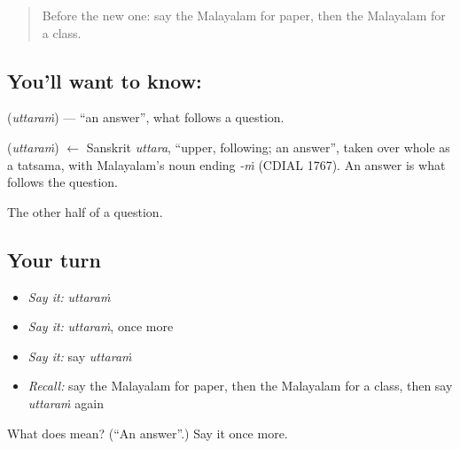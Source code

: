 \label{lesson:ML-C140-answer}



\begin{quote}
Before the new one: say the Malayalam for paper, then the Malayalam for a class.
\end{quote}

\subsection*{You'll want to know: }
\textbf{} (\emph{uttaraṁ}) — \textquotedblleft{}an answer\textquotedblright{}, what follows a question.

\begin{cousinweb}
\textbf{} (\emph{uttaraṁ}) $\leftarrow$ Sanskrit \emph{uttara}, \textquotedblleft{}upper, following; an answer\textquotedblright{}, taken over whole as a tatsama, with Malayalam's noun ending \emph{-ṁ} (CDIAL 1767). An answer is what follows the question.
\end{cousinweb}

\begin{grammarlens}[title={What you've built}]
The other half of a question.
\end{grammarlens}

\subsection*{Your turn}
\begin{itemize}
\raggedright
  \item \emph{Say it:} \emph{uttaraṁ}
  \item \emph{Say it:} \emph{uttaraṁ}, once more
  \item \emph{Say it:} say \emph{uttaraṁ}
  \item \emph{Recall:} say the Malayalam for paper, then the Malayalam for a class, then say \emph{uttaraṁ} again
\end{itemize}

\begin{tcolorbox}[breakable,colback=teal!4,colframe=teal!35!black,title={Before you move on}]
What does  mean? (\textquotedblleft{}An answer\textquotedblright{}.) Say it once more.
\end{tcolorbox}

